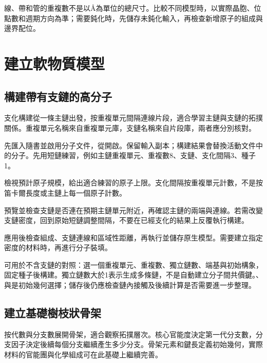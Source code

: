 線、帶和管的重複數不是以\AA 為單位的總尺寸。比較不同模型時，以實際晶胞、位點數和週期方向為準；需要鈍化時，先儲存未鈍化輸入，再檢查新增原子的組成與邊界配位。

\FloatBarrier
\section{建立軟物質模型}

\subsection{構建帶有支鏈的高分子}\label{sec:branched-polymer-reference}

支化構建從一條主鏈出發，按重複單元間隔連線片段，適合學習主鏈與支鏈的拓撲關係。重複單元名稱來自重複單元庫，支鏈名稱來自片段庫，兩者應分別核對。

\begin{steps}
  \item 先匯入隨書並啟用分子文件，從開啟。保留輸入副本；構建結果會替換活動文件中的分子。先用短鏈練習，例如主鏈重複單元、重複數8、支鏈、支化間隔3、種子1。
  \item 檢視預計原子規模，給出適合練習的原子上限。支化間隔按重複單元計數，不是按笛卡爾長度或主鏈上每一個原子計數。
  \item 預覽並檢查支鏈是否連在預期主鏈單元附近，再確認主鏈的兩端與連線。若需改變支鏈密度，回到原始短鏈調整間隔，不要在已經支化的結果上反覆執行構建。
  \item 應用後檢查組成、支鏈連線和區域性距離，再執行並儲存原生模型。需要建立指定密度的材料時，再進行分子裝填。
\end{steps}

可用於不含支鏈的對照：選一個重複單元、重複數、獨立鏈數、端基與初始構象，固定種子後構建。獨立鏈數大於1表示生成多條鏈，不是自動建立分子間共價鍵。、與是初始幾何選擇；儲存後仍應檢查鏈內接觸及後續計算是否需要進一步整理。

\subsection{建立基礎樹枝狀骨架}\label{sec:dendrimer-reference}

按代數與分支數展開骨架，適合觀察拓撲層次。核心官能度決定第一代分支數，分支因子決定後續每個分支繼續產生多少分支。骨架元素和鍵長定義初始幾何，實際材料的官能團與化學組成可在此基礎上繼續完善。


